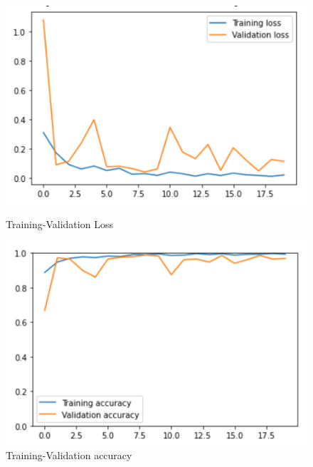 \documentclass[11pt,a4paper]{article}
\theoremstyle{definition}
\begin{document}
\begin{figure}[H]
  \centering
  \begin{minipage}[b]{0.45\textwidth}
    \includegraphics[scale=0.75]{./images/inception2loss}
	\caption{Training-Validation Loss}
  \end{minipage}
  \hfill
  \begin{minipage}[b]{0.45\textwidth}
    \includegraphics[scale=0.75]{./images/inception2acc}
	\caption{Training-Validation accuracy}
  \end{minipage}
\end{figure}
\end{document}
